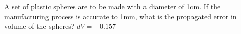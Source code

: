{A set of plastic spheres are to be made with a diameter of 1cm. If the manufacturing process is accurate to 1mm, what is the propagated error in volume of the spheres?
}
{$dV = \pm 0.157$
}

